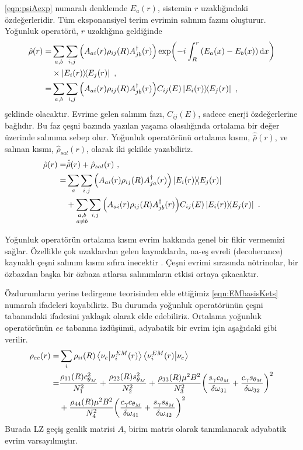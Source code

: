 \eqref{eqn:psiAexp} numaralı denklemde $ E_{a}(r) $, sistemin $ r $ uzaklığındaki özdeğerleridir. Tüm eksponansiyel terim evrimin salınım fazını oluşturur. Yoğunluk operatörü, $ r $ uzaklığına geldiğinde 
\begin{align}
    \nonumber \hat{\rho}(r) =& \sum_{a,b}\sum_{i,j} \qty(A_{ai}(r) \rho_{ij}(R) A^{\dagger}_{jb}(r))\exp(-i\int^{r}_{R} \qty(E_{a}(x)- E_{b}(x)) \dd{x})\\ 
    \nonumber &\times \dyad{E_{i}(r)}{E_{j}(r)} \text{ ,} \\
    =& \sum_{a,b}\sum_{i,j}\qty(A_{ai}(r) \rho_{ij}(R) A^{\dagger}_{jb}(r)) C_{ij}(E)
    \dyad{E_{i}(r)}{E_{j}(r)} \text{ ,}
\end{align}
şeklinde olacaktır. Evrime gelen salınım fazı, $ C_{ij}(E) $, sadece enerji özdeğerlerine bağlıdır. Bu faz çeşni bazında yazılan yaşama olasılığında ortalama bir değer üzerinde salınıma sebep olur. Yoğunluk operatörünü ortalama kısmı, $ \hat{\bar{\rho}}(r) $, ve salınan kısmı, $ \hat{\rho}_{sal}(r) $, olarak iki şekilde yazabiliriz.
\begin{align}\label{eqn:rhoBar_rhoSal}
    \nonumber \hat{\rho}(r) = & \hat{\bar{\rho}}(r) + \hat{\rho}_{sal}(r) \text{ ,}\\
    \nonumber               = &   \sum_{a}\sum_{i,j}\qty(A_{ai}(r) \rho_{ij}(R) A^{\dagger}_{ja}(r)) \dyad{E_{i}(r)}{E_{j}(r)} \\
                              & + \sum_{\substack{a,b\\ a \ne b}}\sum_{i,j}\qty(A_{ai}(r) \rho_{ij}(R) A^{\dagger}_{jb}(r)) C_{ij}(E) \dyad{E_{i}(r)}{E_{j}(r)} \text{ .}
\end{align}

Yoğunluk operatörün ortalama kısmı evrim hakkında genel bir fikir vermemizi sağlar. Özellikle çok uzaklardan gelen kaynaklarda, na-eş evreli (decoherance) kaynaklı çeşni salınım kısmı sıfıra inecektir \cite{GIUNTI199287, Hansen:2016klk}. Çeşni evrimi sırasında nötrinolar, bir özbazdan başka bir özbaza atlarsa salınımların etkisi ortaya çıkacaktır. 

Özdurumların yerine tedirgeme teorisinden elde ettiğimiz \eqref{eqn:EMbasisKets} numaralı ifadeleri koyabiliriz. Bu durumda yoğunluk operatörünün çeşni tabanındaki ifadesini yaklaşık olarak elde edebiliriz. Ortalama yoğunluk operatörünün $ ee $ tabanına izdüşümü, adyabatik bir evrim için aşağıdaki gibi verilir.
\begin{align}
    \nonumber\rho_{ee}(r)  =& \sum_{i} \rho_{ii}(R) \braket{\nu_{e}}{\nu_{i}^{EM}(r)} \braket{\nu_{i}^{EM}(r)}{\nu_{e}} \\
    \nonumber=& \frac{\rho_{11}(R) c^{2}_{\theta_{M}}}{N^{2}_{1}}+ \frac{\rho_{22}(R) s^{2}_{\theta_{M}}}{N^{2}_{2}}+ \frac{\rho_{33}(R) \mu^{2} B^{2}}{N^{2}_{3}} \qty(\frac{s_{\gamma} c_{\theta_{M}}}{\delta \omega_{31}}+\frac{c_{\gamma} s_{\theta_{M}}}{\delta \omega_{32}})^{2}\\
    &+ \frac{\rho_{44}(R) \mu^{2} B^{2}}{N^{2}_{4}} \qty(\frac{c_{\gamma} c_{\theta_{M}}}{\delta \omega_{41}}+\frac{s_{\gamma} s_{\theta_{M}}}{\delta \omega_{42}})^{2}
\end{align}
Burada LZ geçiş genlik matrisi $ A $, birim matris olarak tanımlanarak adyabatik evrim varsayılmıştır.


